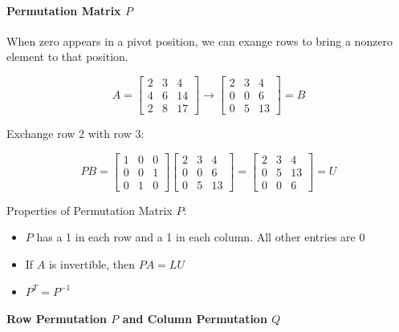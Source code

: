 \paragraph{Permutation Matrix $P$}
When zero appears in a pivot position, we can exange rows to bring a nonzero element to that position.

\[
    A = \begin{bmatrix}
        2 & 3 & 4  \\
        4 & 6 & 14 \\
        2 & 8 & 17
    \end{bmatrix}
    \rightarrow
    \begin{bmatrix}
        2 & 3 & 4  \\
        0 & 0 & 6  \\
        0 & 5 & 13
    \end{bmatrix}
    = B
\]

\noindent Exchange row 2 with row 3:

\[
    PB = \begin{bmatrix}
        1 & 0 & 0 \\
        0 & 0 & 1 \\
        0 & 1 & 0
    \end{bmatrix}
    \begin{bmatrix}
        2 & 3 & 4  \\
        0 & 0 & 6  \\
        0 & 5 & 13
    \end{bmatrix}
    = \begin{bmatrix}
        2 & 3 & 4  \\
        0 & 5 & 13 \\
        0 & 0 & 6
    \end{bmatrix}
    = U
\]

\begin{mdframed}

    Properties of Permutation Matrix $P$:

    \begin{itemize}
        \item $P$ has a 1 in each row and a 1 in each column. All other entries are 0
        \item If $A$ is invertible, then $PA=LU$
        \item $P^T = P^{-1}$
    \end{itemize}
\end{mdframed}

\paragraph{Row Permutation $P$ and Column Permutation $Q$}

